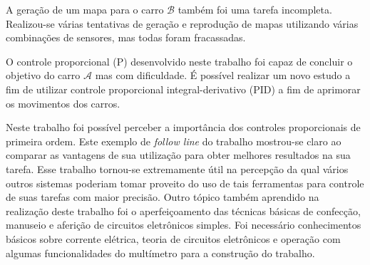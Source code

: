 	A geração de um mapa para o carro $ \mathcal{B} $ também foi uma tarefa incompleta. Realizou-se várias tentativas de geração e reprodução de mapas utilizando várias combinações de sensores, mas todas foram fracassadas.

	O controle proporcional (P) desenvolvido neste trabalho foi capaz de concluir o objetivo do carro $ \mathcal{A} $ mas com dificuldade. É possível realizar um novo estudo a fim de utilizar controle proporcional integral-derivativo (PID) a fim de aprimorar os movimentos dos carros.

	Neste trabalho foi possível perceber a importância dos controles proporcionais de primeira ordem. Este exemplo de \textit{follow line} do trabalho mostrou-se claro ao comparar as vantagens de sua utilização para obter melhores resultados na sua tarefa. 
    Esse trabalho tornou-se extremamente útil na percepção da qual vários outros sistemas poderiam tomar proveito do uso de tais ferramentas para controle de suas tarefas com maior precisão.
	Outro tópico também aprendido na realização deste trabalho foi o aperfeiçoamento das técnicas básicas de confecção, manuseio e aferição de circuitos eletrônicos simples. Foi necessário conhecimentos básicos sobre corrente elétrica, teoria de circuitos eletrônicos e operação com algumas funcionalidades do multímetro para a construção do trabalho.